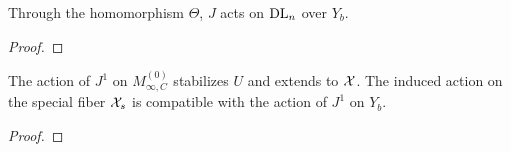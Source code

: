 \documentclass[../main.tex]{subfiles}
\begin{document}
\begin{lem}\label{lem:J1ActionOnYb}
  Through the homomorphism $\Theta$, $J$ acts on $\mathrm{DL}_n$ over $Y_b$.
\begin{proof}
\end{proof}
\end{lem}

\begin{prop}\label{prop:J1ActionOnAffinoid}
  The action of $J^1$ on $M_{\infty, C}^{(0)}$ stabilizes $U$ and extends to
  $\mathcal{X}$. The induced action on the special fiber $\mathcal{X}_s$ is compatible with the
  action of $J^1$ on $Y_b$.
\begin{proof}
\end{proof}
\end{prop}


\end{document}
